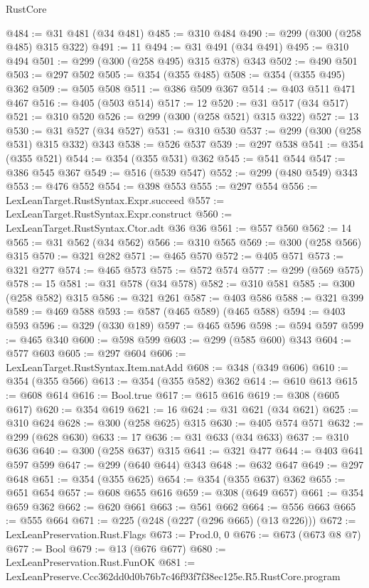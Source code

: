 \begin{lexlean}{RustCore}
\begin{coremodule}
@484 := @31 @481 (@34 @481)
@485 := @310 @484
@490 := @299 (@300 (@258 @485) @315 @322)
@491 := 11
@494 := @31 @491 (@34 @491)
@495 := @310 @494
@501 := @299 (@300 (@258 @495) @315 @378) @343
@502 := @490 @501
@503 := @297 @502
@505 := @354 (@355 @485)
@508 := @354 (@355 @495) @362
@509 := @505 @508
@511 := @386 @509 @367
@514 := @403 @511 @471 @467
@516 := @405 (@503 @514)
@517 := 12
@520 := @31 @517 (@34 @517)
@521 := @310 @520
@526 := @299 (@300 (@258 @521) @315 @322)
@527 := 13
@530 := @31 @527 (@34 @527)
@531 := @310 @530
@537 := @299 (@300 (@258 @531) @315 @332) @343
@538 := @526 @537
@539 := @297 @538
@541 := @354 (@355 @521)
@544 := @354 (@355 @531) @362
@545 := @541 @544
@547 := @386 @545 @367
@549 := @516 (@539 @547)
@552 := @299 (@480 @549) @343
@553 := @476 @552
@554 := @398 @553
@555 := @297 @554
@556 := LexLeanTarget.RustSyntax.Expr.succeed
@557 := LexLeanTarget.RustSyntax.Expr.construct
@560 := LexLeanTarget.RustSyntax.Ctor.adt @36 @36
@561 := @557 @560
@562 := 14
@565 := @31 @562 (@34 @562)
@566 := @310 @565
@569 := @300 (@258 @566) @315
@570 := @321 @282
@571 := @465 @570
@572 := @405 @571
@573 := @321 @277
@574 := @465 @573
@575 := @572 @574
@577 := @299 (@569 @575)
@578 := 15
@581 := @31 @578 (@34 @578)
@582 := @310 @581
@585 := @300 (@258 @582) @315
@586 := @321 @261
@587 := @403 @586
@588 := @321 @399
@589 := @469 @588
@593 := @587 (@465 @589) (@465 @588)
@594 := @403 @593
@596 := @329 (@330 @189)
@597 := @465 @596
@598 := @594 @597
@599 := @465 @340
@600 := @598 @599
@603 := @299 (@585 @600) @343
@604 := @577 @603
@605 := @297 @604
@606 := LexLeanTarget.RustSyntax.Item.natAdd
@608 := @348 (@349 @606)
@610 := @354 (@355 @566)
@613 := @354 (@355 @582) @362
@614 := @610 @613
@615 := @608 @614
@616 := Bool.true
@617 := @615 @616
@619 := @308 (@605 @617)
@620 := @354 @619
@621 := 16
@624 := @31 @621 (@34 @621)
@625 := @310 @624
@628 := @300 (@258 @625) @315
@630 := @405 @574 @571
@632 := @299 (@628 @630)
@633 := 17
@636 := @31 @633 (@34 @633)
@637 := @310 @636
@640 := @300 (@258 @637) @315
@641 := @321 @477
@644 := @403 @641 @597 @599
@647 := @299 (@640 @644) @343
@648 := @632 @647
@649 := @297 @648
@651 := @354 (@355 @625)
@654 := @354 (@355 @637) @362
@655 := @651 @654
@657 := @608 @655 @616
@659 := @308 (@649 @657)
@661 := @354 @659 @362
@662 := @620 @661
@663 := @561 @662
@664 := @556 @663
@665 := @555 @664
@671 := @225 (@248 (@227 (@296 @665) (@13 @226)))
@672 := LexLeanPreservation.Rust.Flags
@673 := Prod.{0, 0}
@676 := @673 (@673 @8 @7)
@677 := Bool
@679 := @13 (@676 @677)
@680 := LexLeanPreservation.Rust.FunOK
@681 := LexLeanPreserve.Ccc362dd0d0b76b7c46f93f7f38ec125e.R5.RustCore.program

\end{coremodule}
\end{lexlean}
